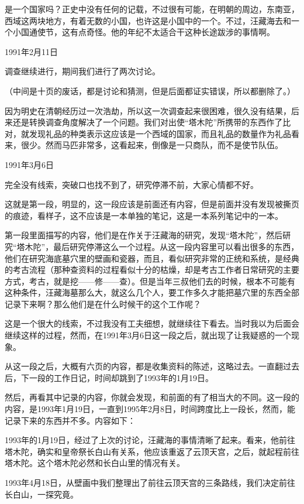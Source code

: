 是一个国家吗？正史中没有任何的记载，不过很有可能，在明朝的周边，东南亚，西域这两块地方，有着无数的小国，也许这是小国中的一个。不过，汪藏海去和一个小国通使节，这有点奇怪。他的年纪不太适合干这种长途跋涉的事情啊。

1991年2月11日

调查继续进行，期间我们进行了两次讨论。

（中间是十页的废话，都是讨论和猜测，但是后面都证实错误，所以都删除了。）

因为明史在清朝经历过一次浩劫，所以这一次调查起来很困难，很久没有结果，后来还是转换调查角度解决了一个问题。我们对出使“塔木陀”所携带的东西作了比对，就发现礼品的种类表示这应该是一个西域的国家，而且礼品的数量作为礼品看来，很少。然而马匹非常多，这看起来，倒像是一只商队，而不是使节队伍。

1991年3月6日

完全没有线索，突破口也找不到了，研究停滞不前，大家心情都不好。

这就是第一段，明显的，这一段应该是前面还有内容，但是前面并没有发现被撕页的痕迹，看样子，这不应该是一本单独的笔记，这是一本系列笔记中的一本。

第一段里面描写的内容，他们是在作关于汪藏海的研究，发现“塔木陀”，然后研究“塔木陀”，最后研究停滞这么一个过程。从这一段内容里可以看出很多的东西，他们在研究海底墓穴里的壁画和瓷器，而且，看似研究非常的正统和系统，是经典的考古流程（那种查资料的过程看似十分的枯燥，却是考古工作者日常研究的主要方式，考古，就是挖——修——查）。但是当年三叔他们去的时候，根本不可能有这种条件，汪藏海墓那么大，就这么几个人，要工作多久才能把墓穴里的东西全部记录下来啊？那么他们是在什么时候干的这个工作呢？

这是一个很大的线索，不过我没有工夫细想，就继续往下看去。当时我以为后面会继续这样的过程，然而，在1991年3月6日这一段之后，就出现了让我疑惑的一个现象。

从这一段之后，大概有六页的内容，都是收集资料的陈述，这略过去。一直翻过去后，下一段的工作日记，时间却跳到了1993年的1月19日。

然后，再看其中记录的内容，你就会发现，和前面的有了相当大的不同。这一段的内容，是1993年1月19日，一直到1995年2月8日，时间跨度比上一段长，然而，能记录下来的东西并不多。内容如下：

1993年的1月19日，经过了上次的讨论，汪藏海的事情清晰了起来。看来，他前往塔木陀，确实和皇帝祭长白山有关系，他应该重返了云顶天宫，之后，就起程前往塔木陀。这个塔木陀必然和长白山里的情况有关。

1993年4月18日，从壁画中我们整理出了前往云顶天宫的三条路线，我们决定前往长白山，一探究竟。

